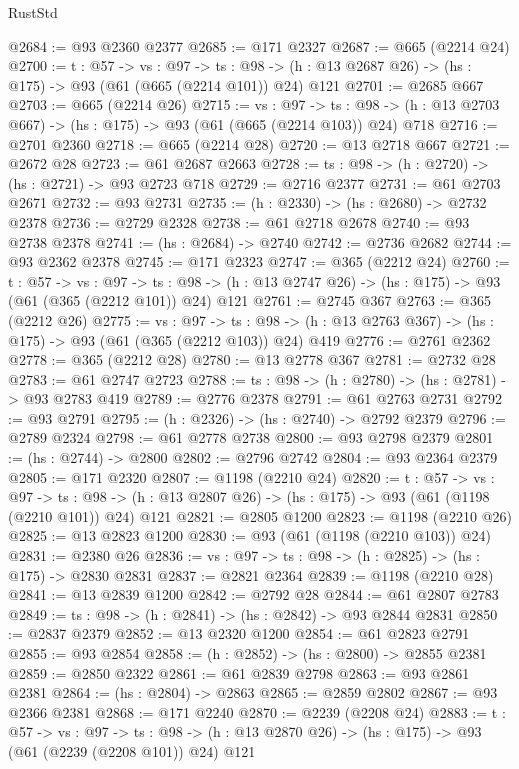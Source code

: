 \begin{lexlean}{RustStd}
\begin{coremodule}
@2684 := @93 @2360 @2377
@2685 := @171 @2327
@2687 := @665 (@2214 @24)
@2700 := {t : @57} ->
  {vs : @97} ->
  {ts : @98} -> (h : @13 @2687 @26) -> (hs : @175) -> @93 (@61 (@665 (@2214 @101)) @24) @121
@2701 := @2685 @667
@2703 := @665 (@2214 @26)
@2715 := {vs : @97} ->
  {ts : @98} -> (h : @13 @2703 @667) -> (hs : @175) -> @93 (@61 (@665 (@2214 @103)) @24) @718
@2716 := @2701 @2360
@2718 := @665 (@2214 @28)
@2720 := @13 @2718 @667
@2721 := @2672 @28
@2723 := @61 @2687 @2663
@2728 := {ts : @98} -> (h : @2720) -> (hs : @2721) -> @93 @2723 @718
@2729 := @2716 @2377
@2731 := @61 @2703 @2671
@2732 := @93 @2731
@2735 := (h : @2330) -> (hs : @2680) -> @2732 @2378
@2736 := @2729 @2328
@2738 := @61 @2718 @2678
@2740 := @93 @2738 @2378
@2741 := (hs : @2684) -> @2740
@2742 := @2736 @2682
@2744 := @93 @2362 @2378
@2745 := @171 @2323
@2747 := @365 (@2212 @24)
@2760 := {t : @57} ->
  {vs : @97} ->
  {ts : @98} -> (h : @13 @2747 @26) -> (hs : @175) -> @93 (@61 (@365 (@2212 @101)) @24) @121
@2761 := @2745 @367
@2763 := @365 (@2212 @26)
@2775 := {vs : @97} ->
  {ts : @98} -> (h : @13 @2763 @367) -> (hs : @175) -> @93 (@61 (@365 (@2212 @103)) @24) @419
@2776 := @2761 @2362
@2778 := @365 (@2212 @28)
@2780 := @13 @2778 @367
@2781 := @2732 @28
@2783 := @61 @2747 @2723
@2788 := {ts : @98} -> (h : @2780) -> (hs : @2781) -> @93 @2783 @419
@2789 := @2776 @2378
@2791 := @61 @2763 @2731
@2792 := @93 @2791
@2795 := (h : @2326) -> (hs : @2740) -> @2792 @2379
@2796 := @2789 @2324
@2798 := @61 @2778 @2738
@2800 := @93 @2798 @2379
@2801 := (hs : @2744) -> @2800
@2802 := @2796 @2742
@2804 := @93 @2364 @2379
@2805 := @171 @2320
@2807 := @1198 (@2210 @24)
@2820 := {t : @57} ->
  {vs : @97} ->
  {ts : @98} -> (h : @13 @2807 @26) -> (hs : @175) -> @93 (@61 (@1198 (@2210 @101)) @24) @121
@2821 := @2805 @1200
@2823 := @1198 (@2210 @26)
@2825 := @13 @2823 @1200
@2830 := @93 (@61 (@1198 (@2210 @103)) @24)
@2831 := @2380 @26
@2836 := {vs : @97} -> {ts : @98} -> (h : @2825) -> (hs : @175) -> @2830 @2831
@2837 := @2821 @2364
@2839 := @1198 (@2210 @28)
@2841 := @13 @2839 @1200
@2842 := @2792 @28
@2844 := @61 @2807 @2783
@2849 := {ts : @98} -> (h : @2841) -> (hs : @2842) -> @93 @2844 @2831
@2850 := @2837 @2379
@2852 := @13 @2320 @1200
@2854 := @61 @2823 @2791
@2855 := @93 @2854
@2858 := (h : @2852) -> (hs : @2800) -> @2855 @2381
@2859 := @2850 @2322
@2861 := @61 @2839 @2798
@2863 := @93 @2861 @2381
@2864 := (hs : @2804) -> @2863
@2865 := @2859 @2802
@2867 := @93 @2366 @2381
@2868 := @171 @2240
@2870 := @2239 (@2208 @24)
@2883 := {t : @57} ->
  {vs : @97} ->
  {ts : @98} -> (h : @13 @2870 @26) -> (hs : @175) -> @93 (@61 (@2239 (@2208 @101)) @24) @121

\end{coremodule}
\end{lexlean}
